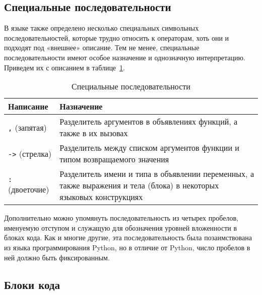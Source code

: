 \subsection{Специальные последовательности}
\label{sec:special_sequences}

В языке также определено несколько специальных символьных последовательностей, которые трудно относить к операторам, хоть они и подходят под «внешнее» описание.
Тем не менее, специальные последовательности имеют особое назначение и однозначную интерпретацию.
Приведем их с описанием в таблице~\ref{tab:special_sequences}.

\begin{table}[h]
    \centering
    \caption{Специальные последовательности}
    \label{tab:special_sequences}
    \begin{tabular}{p{3cm}p{12cm}}
        \toprule
        \textbf{Написание}   & \textbf{Назначение}                                                                                                  \\
        \midrule
        \verb|,| (запятая)   & Разделитель аргументов в объявлениях функций, а также в их вызовах                                                   \\
        \addlinespace
        \verb|->| (стрелка)  & Разделитель между списком аргументов функции и типом возвращаемого значения                                          \\
        \addlinespace
        \verb|:| (двоеточие) & Разделитель имени и типа в объявлении переменных, а также выражения и тела (блока) в некоторых языковых конструкциях \\
        \bottomrule
    \end{tabular}
\end{table}

Дополнительно можно упомянуть последовательность из четырех пробелов, именуемую отступом и служащую для обозначения уровней вложенности в блоках кода.
Как и многие другие, эта последовательность была позаимствована из языка программирования Python, но в отличие от Python, число пробелов в ней должно быть фиксированным.

\subsection{Блоки кода}

